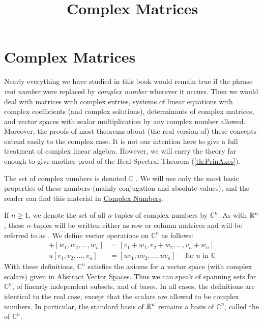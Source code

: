 \documentclass{ximera}
\title{Complex Matrices} \license{CC BY-NC-SA 4.0}
\begin{document}
\begin{abstract}
\end{abstract}
\maketitle

\section*{Complex Matrices}
Nearly everything we have studied in this book would remain true if the phrase \textit{real number} were replaced by \textit{complex number}
 wherever it occurs. Then we would deal with matrices with complex
entries, systems of linear equations with complex coefficients (and
complex solutions), determinants of complex matrices, and vector spaces
with scalar multiplication by any complex number allowed. Moreover, the
proofs of most theorems about (the real version of) these concepts
extend easily to the complex case. It is not our intention here to give a
 full treatment of complex linear algebra. However, we will carry the
theory far enough to give another proof of the Real Spectral Theorem (\ref{th:PrinAxes}).

The set of complex numbers is denoted $\mathbb{C}$ . We will use only the most basic properties of these numbers (mainly conjugation and absolute values), and the reader can find this material in \href{https://ximera.osu.edu/oerlinalg/LinearAlgebra/APX-0020/main}{Complex Numbers}.

If $n \ge 1$, we denote the set of all $n$-tuples of complex numbers by $\mathbb{C}^n$. As with $\mathbb{R}^n$, these $n$-tuples will be written either as row or column matrices and will be referred to as . We define vector operations on $\mathbb{C}^n$ as follows:
\begin{align*}
[v_{1},  v_{2}, \ldots, v_{n}] + [w_{1}, w_{2}, \ldots, w_{n}] &= [v_{1} + w_{1}, v_{2} + w_{2}, \ldots, v_{n} + w_{n}] \\
u[v_{1}, v_{2}, \ldots, v_{n}] &= [uv_{1}, uv_{2}, \ldots, uv_{n}] \quad \mbox{ for } u \mbox{ in } \mathbb{C}
\end{align*}
With these definitions, $\mathbb{C}^n$ satisfies the axioms for a vector space (with complex scalars) given in \href{https://ximera.osu.edu/oerlinalg/LinearAlgebra/VSP-0050/main}{Abstract Vector Spaces}. Thus we can speak of spanning sets for $\mathbb{C}^n$, of linearly independent subsets, and of bases. In all cases, the definitions are identical to the real case, except that the scalars are allowed to be complex numbers. In particular, the standard basis of $\mathbb{R}^n$ remains a basis of $\mathbb{C}^n$, called the  of $\mathbb{C}^n$.
\end{document}
